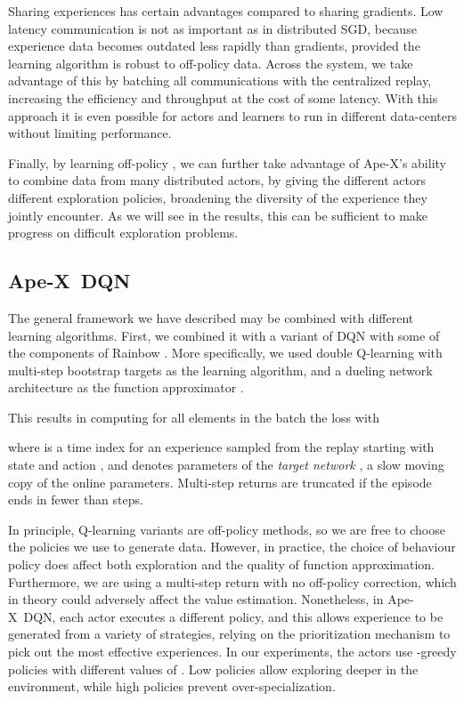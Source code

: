 \documentclass{article} \PassOptionsToPackage{usenames,dvipsnames}{xcolor}
\def\apex{Ape-X}
\begin{document}
Sharing experiences has certain advantages compared to sharing gradients. Low latency communication is not as important as in distributed SGD, because experience data becomes outdated less rapidly than gradients, provided the learning algorithm is robust to off-policy data. Across the system, we take advantage of this by batching all communications with the centralized replay, increasing the efficiency and throughput at the cost of some latency. With this approach it is even possible for actors and learners to run in different data-centers without limiting performance.

Finally, by learning off-policy \citep[cf.][]{SuttonBarto:1998,SuttonBarto:2017}, we can further take advantage of \apex's ability to combine data from many distributed actors, by giving the different actors different exploration policies, broadening the diversity of the experience they jointly encounter. As we will see in the results, this can be sufficient to make progress on difficult exploration problems.

\subsection{\apex\ DQN}

The general framework we have described may be combined with different learning algorithms. First, we combined it with a variant of DQN \citep{dqn} with some of the components of Rainbow \citep{rainbow}. More specifically, we used double Q-learning \citep{doubleq, deepdoubleqlearning} with multi-step bootstrap targets \citep[cf.][]{Sutton:1988, SuttonBarto:1998, SuttonBarto:2017, a3c} as the learning algorithm, and a dueling network architecture \citep{dueling} as the function approximator .

This results in computing for all elements in the batch the loss  with 

where  is a time index for an experience sampled from the replay starting with state  and action , and  denotes parameters of the \emph{target network} \citep{dqn}, a slow moving copy of the online parameters. Multi-step returns are truncated if the episode ends in fewer than  steps.

In principle, Q-learning variants are off-policy methods, so we are free to choose the policies we use to generate data. However, in practice, the choice of behaviour policy does affect both exploration and the quality of function approximation. Furthermore, we are using a multi-step return with no off-policy correction, which in theory could adversely affect the value estimation. Nonetheless, in \apex\ DQN, each actor executes a different policy, and this allows experience to be generated from a variety of strategies, relying on the prioritization mechanism to pick out the most effective experiences. In our experiments, the actors use -greedy policies with different values of . Low  policies allow exploring deeper in the environment, while high  policies prevent over-specialization.
\end{document}

